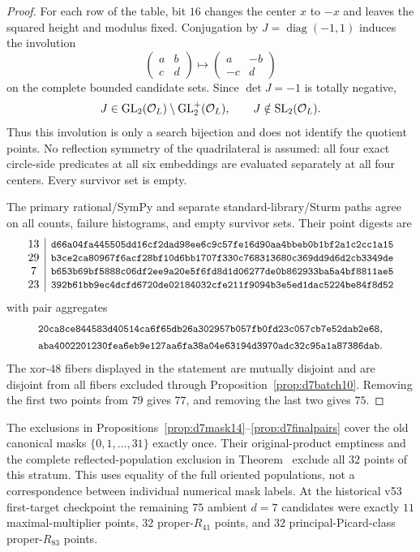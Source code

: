 \begin{proof}
For each row of the table, bit $16$ changes the center $x$ to $-x$ and leaves
the squared height and modulus fixed.  Conjugation by
$J=\operatorname{diag}(-1,1)$ induces the involution
\[
 \begin{pmatrix}a&b\\c&d\end{pmatrix}
 \longmapsto
 \begin{pmatrix}a&-b\\-c&d\end{pmatrix}
\]
on the complete bounded candidate sets.  Since $\det J=-1$ is totally
negative,
\[
 J\in\operatorname{GL}_2(\mathcal O_L)\setminus\operatorname{GL}_2^+(\mathcal O_L),\qquad J\notin\operatorname{SL}_2(\mathcal O_L).
\]
Thus this involution is only a search bijection and does not identify the
quotient points.  No reflection symmetry of the quadrilateral is assumed:
all four exact circle-side predicates at all six embeddings are evaluated
separately at all four centers.  Every survivor set is empty.

The primary rational/SymPy and separate standard-library/Sturm paths agree on
all counts, failure histograms, and empty survivor sets.  Their point digests
are
\[
\begin{array}{c|l}
13&\digest{d66a04fa445505dd16cf2dad98ee6c9c}{57fe16d90aa4bbeb0b1bf2a1c2cc1a15}\\
29&\digest{b3ce2ca80967f6acf28bf10d6bb1707f}{330c768313680c369dd9d6d2cb3349de}\\
7 &\digest{b653b69bf5888c06df2ee9a20e5f6fd8}{d1d06277de0b862933ba5a4bf8811ae5}\\
23&\digest{392b61bb9ec4dcfd6720de02184032cf}{e211f9094b3e5ed1dac5224be84f8d52}
\end{array}
\]
with pair aggregates
\[
\begin{gathered}
\digest{20ca8ce844583d40514ca6f65db26a30}{2957b057fb0fd23c057cb7e52dab2e68},\\
\digest{aba4002201230fea6eb9e127aa6fa38a}{04e63194d3970adc32c95a1a87386dab}.
\end{gathered}
\]
The xor-$48$ fibers displayed in the statement are mutually disjoint and are
disjoint from all fibers excluded through Proposition~\ref{prop:d7batch10}.
Removing the first two points from $79$ gives $77$, and removing the last two
gives $75$.
\end{proof}

\begin{corollary}\label{cor:d7r83nontrivial}
The exclusions in Propositions~\ref{prop:d7mask14}--\ref{prop:d7finalpairs}
cover the old canonical masks $\{0,1,\ldots,31\}$ exactly once.
Their original-product emptiness and the complete reflected-population
exclusion in Theorem~ exclude all $32$ points
of this stratum. This uses equality of the full oriented populations,
not a correspondence between individual numerical mask labels.
At the historical v53 first-target checkpoint the remaining
$75$ ambient $d=7$ candidates were exactly $11$ maximal-multiplier points,
$32$ proper-$R_{41}$ points, and $32$ principal-Picard-class proper-$R_{83}$
points.
\end{corollary}

